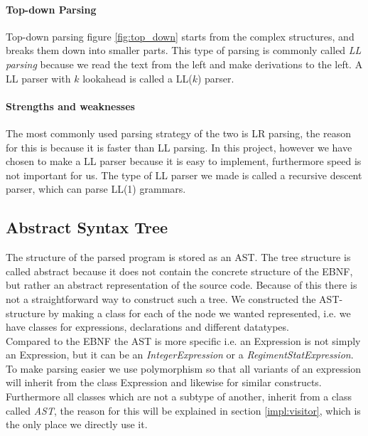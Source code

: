 	\paragraph{Top-down Parsing}
		Top-down parsing figure \ref{fig:top_down} starts from the complex structures, and breaks them down into smaller parts.
		This type of parsing is commonly called {\it LL parsing} because we read the text from the left and make derivations to the left.
		A LL parser with $k$ lookahead is called a LL($k$) parser.
	\paragraph{Strengths and weaknesses}
		The most commonly used parsing strategy of the two is LR parsing, the reason for this is because it is faster than LL parsing.
		In this project, however we have chosen to make a LL parser because it is easy to implement, furthermore speed is not important for us. 
		The type of LL parser we made is called a recursive descent parser, which can parse LL(1) grammars.
		
	\subsection{Abstract Syntax Tree}
		\label{ast}
		The structure of the parsed program is stored as an AST. The tree structure is called abstract because it does not contain the concrete
		structure of the EBNF, but rather an abstract representation of the source code. Because of this there is not a straightforward way to 
		construct such a tree.  We constructed the AST-structure by making a class for each of the node we wanted represented, i.e. we have 
		classes for expressions, declarations and different datatypes. \\
		
		Compared to the EBNF the AST is more specific i.e. an Expression 
		is not simply an Expression, but it can be an {\it IntegerExpression} or a {\it RegimentStatExpression}. 
		To make parsing easier we use polymorphism so that all variants of an expression 
		will inherit from the class Expression and likewise for similar constructs. 
		Furthermore all classes which are not a subtype of another, inherit from a class called {\it AST}, 
		the reason for this will be explained in section \ref{impl:visitor}, which is the only place we directly use it.
		
